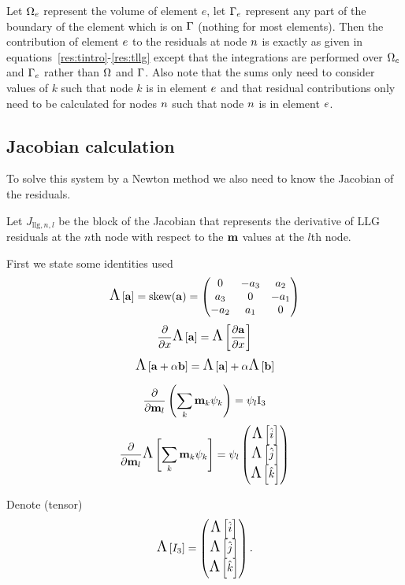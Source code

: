 Let $\Omega_e$ represent the volume of element $e$, let ${\Gamma}_e$ represent any part of the boundary of the element which is on ${\Gamma}$ (nothing for most elements). Then the contribution of element $e$ to the residuals at node $n$ is exactly as given in equations~\eqref{res:tintro}-\eqref{res:tllg} except that the integrations are performed over $\Omega_e$ and ${\Gamma}_e$ rather than $\Omega$ and ${\Gamma}$. Also note that the sums only need to consider values of $k$ such that node $k$ is in element $e$ and that residual contributions only need to be calculated for nodes $n$ such that node $n$ is in element $e$.

\subsection{Jacobian calculation}
\label{sec:jacobian-calculation}

To solve this system by a Newton method we also need to know the Jacobian of the residuals.

Let $J_{\text{llg},n,l}$ be the block of the Jacobian that represents the derivative of LLG residuals at the $n$th node with respect to the $\mathbf{m}$ values at the $l$th node.

First we state some identities used
\begin{equation}
  \text{\Large{$\Lambda$}}\left[ {\mathbf{a}} \right] = \text{skew}({\mathbf{a}}) =
  \begin{pmatrix}
    0 & -a_3 & a_2 \\
    a_3 & 0 & -a_1 \\
    -a_2 & a_1 & 0
  \end{pmatrix}
\end{equation}
\begin{equation}
  \frac{\partial }{\partial x} \text{\Large{$\Lambda$}}\left[ {\mathbf{a}} \right] = \text{\Large{$\Lambda$}}\left[  \frac{\partial {\mathbf{a}}}{\partial x}  \right]
\end{equation}
\begin{equation}
  \text{\Large{$\Lambda$}}\left[ {\mathbf{a}} + \alpha {\mathbf{b}} \right] = \text{\Large{$\Lambda$}}\left[ {\mathbf{a}} \right] + \alpha \text{\Large{$\Lambda$}}\left[ {\mathbf{b}} \right]
\end{equation}

\begin{equation}
  \frac{\partial }{\partial \mathbf{m}_l} \left( \sum_k \mathbf{m}_k {\psi_k} \right) = \psi_l \text{I}_3
\end{equation}
\begin{equation}
  \frac{\partial }{\partial \mathbf{m}_l} \text{\Large{$\Lambda$}}\left[  \sum_k \mathbf{m}_k {\psi_k}  \right] = \psi_l
  \begin{pmatrix} \text{\Large{$\Lambda$}}\left[ {\hat{i}} \right] \\ \text{\Large{$\Lambda$}}\left[ {\hat{j}} \right] \\ \text{\Large{$\Lambda$}}\left[ {\hat{k}} \right] \end{pmatrix}
\end{equation}

Denote (tensor)
\[
\text{\Large{$\Lambda$}}\left[ I_3 \right] = \begin{pmatrix} \text{\Large{$\Lambda$}}\left[ {\hat{i}} \right] \\ \text{\Large{$\Lambda$}}\left[ {\hat{j}} \right] \\ \text{\Large{$\Lambda$}}\left[ {\hat{k}} \right] \end{pmatrix}.
\]

